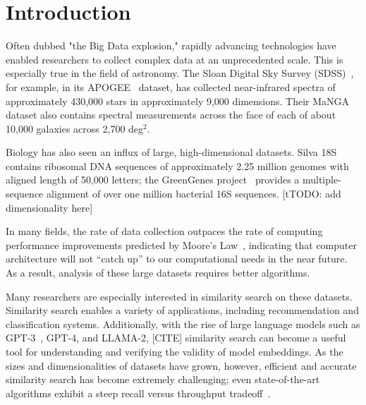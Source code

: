 \section{Introduction}
\label{sec:introduction}
Often dubbed "the Big Data explosion," rapidly advancing technologies have enabled researchers to collect complex data at an unprecedented scale. 
This is especially true in the field of astronomy. 
The Sloan Digital Sky Survey (SDSS)~\cite{blanton2017sdss}, for example, in its APOGEE~\cite{alam2015eleventh} dataset, has collected near-infrared spectra of approximately 430,000 stars in approximately 9,000 dimensions. 
Their MaNGA dataset also contains spectral measurements across the face of each of about 10,000 galaxies across 2,700 deg$^2$. 

Biology has also seen an influx of large, high-dimensional datasets. Silva 18S~\cite{10.1093/nar/gks1219} contains ribosomal DNA sequences of approximately 2.25 
million genomes with aligned length of 50,000 letters; 
the GreenGenes project~\cite{desantis2006greengenes} provides a multiple-sequence alignment of over one million bacterial 16S sequences. [tTODO: add dimensionality here]




In many fields, the rate of data collection outpaces the rate of computing performance improvements predicted by Moore's Law~\cite{brescia2012extracting}, indicating 
that computer architecture will not ``catch up'' to our computational needs in the near future. As a result, analysis of these large datasets 
requires better algorithms. 

Many researchers are especially interested in similarity search on these datasets. 
Similarity search enables a variety of applications, including recommendation and classification systems. 
Additionally, with the rise of large language models such as GPT-3~\cite{2020arXiv200514165B}, GPT-4, and LLAMA-2, [CITE] similarity search can become a useful tool for 
understanding and verifying the validity of model embeddings. 
As the sizes and dimensionalities of datasets have grown, however, efficient and accurate similarity search has become extremely challenging; 
even state-of-the-art algorithms exhibit a steep recall versus throughput tradeoff~\cite{ishaq2019clustered}.


